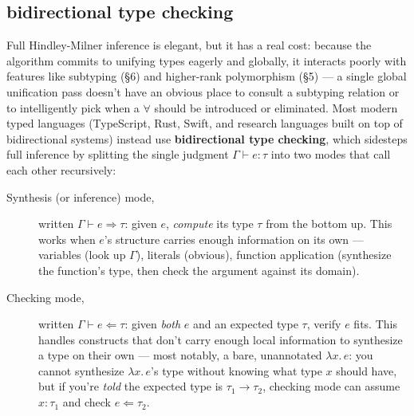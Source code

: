 \subsection{bidirectional type checking}

Full Hindley-Milner inference is elegant, but it has a real cost: because the algorithm commits to unifying types eagerly and globally, it interacts poorly with features like subtyping (\S6) and higher-rank polymorphism (\S5) — a single global unification pass doesn't have an obvious place to consult a subtyping relation or to intelligently pick when a $\forall$ should be introduced or eliminated. Most modern typed languages (TypeScript, Rust, Swift, and research languages built on top of bidirectional systems) instead use \textbf{bidirectional type checking}, which sidesteps full inference by splitting the single judgment $\Gamma\vdash e:\tau$ into two modes that call each other recursively:

\begin{description}
  \item[Synthesis (or inference) mode,] written $\Gamma \vdash e \Rightarrow \tau$: given $e$, \emph{compute} its type $\tau$ from the bottom up. This works when $e$'s structure carries enough information on its own — variables (look up $\Gamma$), literals (obvious), function application (synthesize the function's type, then check the argument against its domain).
  \item[Checking mode,] written $\Gamma \vdash e \Leftarrow \tau$: given \emph{both} $e$ and an expected type $\tau$, verify $e$ fits. This handles constructs that don't carry enough local information to synthesize a type on their own — most notably, a bare, unannotated $\lambda x.\,e$: you cannot synthesize $\lambda x.\,e$'s type without knowing what type $x$ should have, but if you're \emph{told} the expected type is $\tau_1\to\tau_2$, checking mode can assume $x:\tau_1$ and check $e \Leftarrow \tau_2$.
\end{description}

